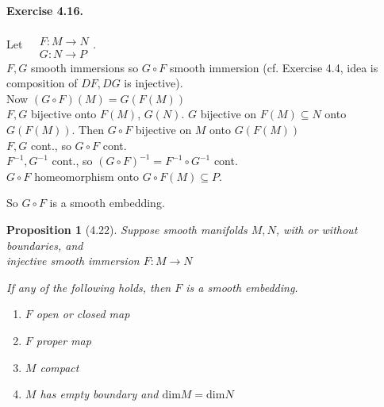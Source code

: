 \documentclass[11pt]{amsart}
\newtheorem{proposition}{Proposition}
\theoremstyle{definition}
\newcommand{\exercisehead}[1]{\medskip\noindent\textbf{Exercise #1.} }
\begin{document}
\exercisehead{4.16}

Let $\begin{aligned} & \quad \\
    & F : M \to N \\
    & G:N \to P \end{aligned}$.  \\
$F,G$ smooth immersions so $G\circ F$ smooth immersion (cf. Exercise 4.4, idea is composition of $DF, DG$ is injective).  \\
Now $(G \circ F)(M) = G(F(M))$ \\
$F,G$ bijective onto $F(M)$, $G(N)$.  $G$ bijective on $F(M) \subseteq N$ onto $G(F(M))$.  Then $G\circ F$ bijective on $M$ onto $G(F(M))$ \\
$F,G$ cont., so $G\circ F $ cont.  \\
$F^{-1},G^{-1}$ cont., so $(G\circ F)^{-1}= F^{-1} \circ G^{-1}$ cont.  \\
$G\circ F$ homeomorphism onto $G\circ F(M) \subseteq P$.

So $G\circ F$ is a smooth embedding.


\begin{proposition}[4.22]
        Suppose smooth manifolds $M,N$, with or without boundaries, and \\
injective smooth immersion $F:M\to N$

If any of the following holds, then $F$ is a smooth embedding.
\begin{enumerate}
        \item[(a)] $F$ open or closed map
        \item[(b)] $F$ proper map
        \item[(c)] $M$ compact
        \item[(d)] $M$ has empty boundary and $\text{dim}M = \text{dim}N$
\end{enumerate}
\end{proposition}
\end{document}
